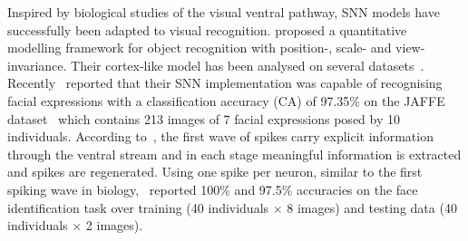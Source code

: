 
Inspired by biological studies of the visual ventral pathway, SNN models have successfully been adapted to visual recognition. \cite{riesenhuber1999hierarchical} proposed a quantitative modelling framework for object recognition with position-, scale- and view-invariance.
Their cortex-like model has been analysed on several datasets~\cite{serre2007robust}.
Recently~\cite{fu2012spiking} reported that their SNN implementation was capable of recognising facial expressions with a classification accuracy (CA) of 97.35\% on the JAFFE dataset~\cite{lyons1998coding} which contains 213 images of 7 facial expressions posed by 10 individuals.
According to~\cite{vanrullen2002surfing}, the first wave of spikes carry explicit information through the ventral stream and in each stage meaningful information is extracted and spikes are regenerated. 
Using one spike per neuron, similar to the first spiking wave in biology,~\cite{delorme2001face} reported 100\% and 97.5\% accuracies on the face identification task over
training (40 individuals $\times$ 8 images) and testing data (40 individuals $\times$ 2 images).

